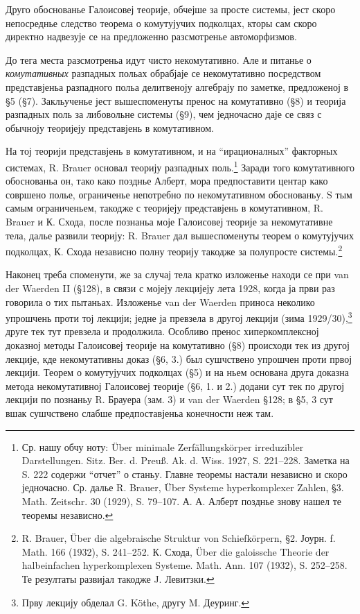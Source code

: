 ﻿\documentclass[11pt]{article}
\newcommand{\foreign}[1]{#1}
\begin{document}
Друго обоснованье Галоисовеј теорије, обчејше за просте системы, јест скоро непосреднье следство теорема о комутујучих подколцах, кторы сам скоро директно надвезује се на предложенно разсмотренье автоморфизмов.

До тега места разсмотреньа идут чисто некомутативно. Але и питанье о \emph{комутативных} разпадных польах обрабјаје се некомутативно посредством представјеньа разпадного польа делитвеноју алгебрају по заметке, предложеној в §5 (§7). Закльученье јест вышеспоменуты пренос на комутативно (§8) и теорија разпадных поль за либовольне системы (§9), чем једночасно даје се связ с обычноју теоријеју представјень в комутативном.

На тој теорији представјень в комутативном, и на ``ирационалных'' факторных системах, R. Brauer основал теорију разпадных поль.\footnote{Ср. нашу обчу ноту: \foreign{Über minimale Zerfällungskörper irreduzibler Darstellungen}. Sitz. Ber. d. Preuß. Ak. d. Wiss. 1927, S. 221--228. Заметка на S. 222 содержи ``отчет'' о станьу. Главне теоремы настали независно и скоро једночасно. Ср. далье R. Brauer, \foreign{Über Systeme hyperkomplexer Zahlen}, §3. Math. Zeitschr. 30 (1929), S. 79--107. А. А. Алберт позднье знову нашел те теоремы независно.} Заради того комутативного обоснованьа он, тако како позднье Алберт, мора предпоставити центар како совршено полье, ограниченье непотребно по некомутативном обоснованьу. S тым самым ограниченьем, такодже с теоријеју представјень в комутативном, R. Brauer и К. Схода, после познаньа моје Галоисовеј теорије за некомутативне тела, далье развили теорију: R. Brauer дал вышеспоменуты теорем о комутујучих подколцах, К. Схода независно полну теорију такодже за полупросте системы.\footnote{R. Brauer, \foreign{Über die algebraische Struktur von Schiefkörpern}, §2. Јоурн. f. Math. 166 (1932), S. 241--252. К. Схода, \foreign{Über die galoissche Theorie der halbeinfachen hyperkomplexen Systeme}. Math. Ann. 107 (1932), S. 252--258. Те резултаты развијал такодже J. Левитзки.}

Наконец треба споменути, же за случај тела кратко изложенье находи се при van der Waerden II (§128), в связи с мојеју лекцијеју лета 1928, когда ја први раз говорила о тих пытаньах. Изложенье van der Waerden приноса неколико упрошчень проти тој лекцији; једне ја превзела в другој лекцији (зима 1929/30),\footnote{Прву лекцију обделал G. Köthe, другу M. Деуринг.} друге тек тут превзела и продолжила. Особливо пренос хиперкомплексној доказној методы Галоисовеј теорије на комутативно (§8) происходи тек из другој лекције, кде некомутативны доказ (§6, 3.) был сушчствено упрошчен проти првој лекцији. Теорем о комутујучих подколцах (§5) и на ньем основана друга доказна метода некомутативној Галоисовеј теорије (§6, 1. и 2.) додани сут тек по другој лекцији по познаньу R. Брауера (зам. 3) и van der Waerden §128; в §5, 3 сут вшак сушчствено слабше предпоставјеньа конечности неж там.
\end{document}

